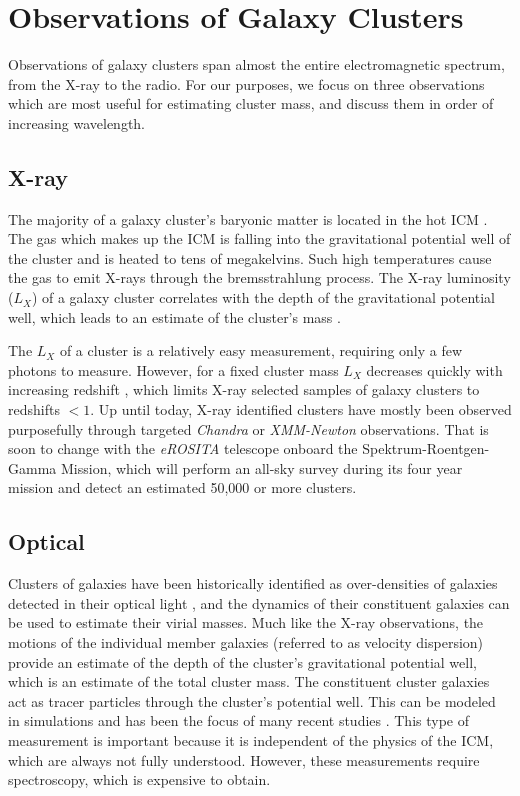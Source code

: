 \section{Observations of Galaxy Clusters}
Observations of galaxy clusters span almost the entire electromagnetic spectrum, from the X-ray to the radio. For our purposes, we focus on three observations which are most useful for estimating cluster mass, and discuss them in order of increasing wavelength.

\subsection{X-ray}
The majority of a galaxy cluster's baryonic matter is located in the hot ICM \citep{Voit2005}. The gas which makes up the ICM is falling into the gravitational potential well of the cluster and is heated to tens of megakelvins. Such high temperatures cause the gas to emit X-rays through the bremsstrahlung process. The X-ray luminosity ($L_X$) of a galaxy cluster correlates with the depth of the gravitational potential well, which leads to an estimate of the cluster's mass . 

The $L_X$ of a cluster is a relatively easy measurement, requiring only a few photons to measure. However, for a fixed cluster mass $L_X$ decreases quickly with increasing redshift , which limits X-ray selected samples of galaxy clusters to redshifts $< 1$. Up until today, X-ray identified clusters have mostly been observed purposefully through targeted \textit{Chandra} or \textit{XMM-Newton} observations. That is soon to change with the \textit{eROSITA} \citep{Pillepich2012} telescope onboard the Spektrum-Roentgen-Gamma Mission, which will perform an all-sky survey during its four year mission and detect an estimated 50,000 or more clusters.

\subsection{Optical}
Clusters of galaxies have been historically identified as over-densities of galaxies detected in their optical light , and the dynamics of their constituent galaxies can be used to estimate their virial masses. Much like the X-ray observations, the motions of the individual member galaxies (referred to as velocity dispersion) provide an estimate of the depth of the cluster's gravitational potential well, which is an estimate of the total cluster mass. The constituent cluster galaxies act as tracer particles through the cluster's potential well. This can be modeled in simulations and has been the focus of many recent studies . This type of measurement is important because it is independent of the physics of the ICM, which are always not fully understood. However, these measurements require spectroscopy, which is expensive to obtain.

